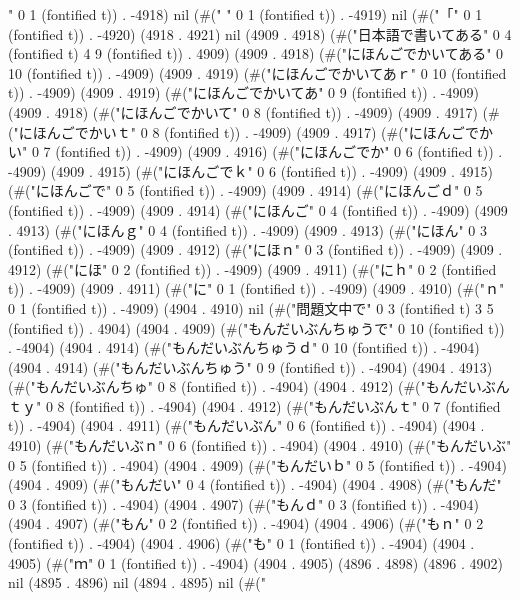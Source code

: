 " 0 1 (fontified t)) . -4918) nil (#("	" 0 1 (fontified t)) . -4919) nil (#("「" 0 1 (fontified t)) . -4920) (4918 . 4921) nil (4909 . 4918) (#("日本語で書いてある" 0 4 (fontified t) 4 9 (fontified t)) . 4909) (4909 . 4918) (#("にほんごでかいてある" 0 10 (fontified t)) . -4909) (4909 . 4919) (#("にほんごでかいてあｒ" 0 10 (fontified t)) . -4909) (4909 . 4919) (#("にほんごでかいてあ" 0 9 (fontified t)) . -4909) (4909 . 4918) (#("にほんごでかいて" 0 8 (fontified t)) . -4909) (4909 . 4917) (#("にほんごでかいｔ" 0 8 (fontified t)) . -4909) (4909 . 4917) (#("にほんごでかい" 0 7 (fontified t)) . -4909) (4909 . 4916) (#("にほんごでか" 0 6 (fontified t)) . -4909) (4909 . 4915) (#("にほんごでｋ" 0 6 (fontified t)) . -4909) (4909 . 4915) (#("にほんごで" 0 5 (fontified t)) . -4909) (4909 . 4914) (#("にほんごｄ" 0 5 (fontified t)) . -4909) (4909 . 4914) (#("にほんご" 0 4 (fontified t)) . -4909) (4909 . 4913) (#("にほんｇ" 0 4 (fontified t)) . -4909) (4909 . 4913) (#("にほん" 0 3 (fontified t)) . -4909) (4909 . 4912) (#("にほｎ" 0 3 (fontified t)) . -4909) (4909 . 4912) (#("にほ" 0 2 (fontified t)) . -4909) (4909 . 4911) (#("にｈ" 0 2 (fontified t)) . -4909) (4909 . 4911) (#("に" 0 1 (fontified t)) . -4909) (4909 . 4910) (#("ｎ" 0 1 (fontified t)) . -4909) (4904 . 4910) nil (#("問題文中で" 0 3 (fontified t) 3 5 (fontified t)) . 4904) (4904 . 4909) (#("もんだいぶんちゅうで" 0 10 (fontified t)) . -4904) (4904 . 4914) (#("もんだいぶんちゅうｄ" 0 10 (fontified t)) . -4904) (4904 . 4914) (#("もんだいぶんちゅう" 0 9 (fontified t)) . -4904) (4904 . 4913) (#("もんだいぶんちゅ" 0 8 (fontified t)) . -4904) (4904 . 4912) (#("もんだいぶんｔｙ" 0 8 (fontified t)) . -4904) (4904 . 4912) (#("もんだいぶんｔ" 0 7 (fontified t)) . -4904) (4904 . 4911) (#("もんだいぶん" 0 6 (fontified t)) . -4904) (4904 . 4910) (#("もんだいぶｎ" 0 6 (fontified t)) . -4904) (4904 . 4910) (#("もんだいぶ" 0 5 (fontified t)) . -4904) (4904 . 4909) (#("もんだいｂ" 0 5 (fontified t)) . -4904) (4904 . 4909) (#("もんだい" 0 4 (fontified t)) . -4904) (4904 . 4908) (#("もんだ" 0 3 (fontified t)) . -4904) (4904 . 4907) (#("もんｄ" 0 3 (fontified t)) . -4904) (4904 . 4907) (#("もん" 0 2 (fontified t)) . -4904) (4904 . 4906) (#("もｎ" 0 2 (fontified t)) . -4904) (4904 . 4906) (#("も" 0 1 (fontified t)) . -4904) (4904 . 4905) (#("ｍ" 0 1 (fontified t)) . -4904) (4904 . 4905) (4896 . 4898) (4896 . 4902) nil (4895 . 4896) nil (4894 . 4895) nil (#("
